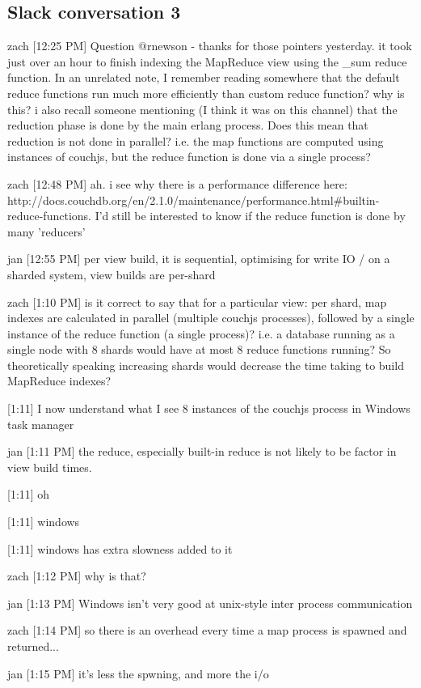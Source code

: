 \subsection{Slack conversation 3}
\label{appendix:slack3}

zach [12:25 PM]
Question @rnewson - thanks for those pointers yesterday. it took just over an hour to finish indexing the MapReduce view using the \_sum reduce function. In an unrelated note, I remember reading somewhere that the default reduce functions run much more efficiently than custom reduce function? why is this? i also recall someone mentioning (I think it was on this channel) that the reduction phase is done by the main erlang process. Does this mean that reduction is not done in parallel? i.e. the map functions are computed using instances of couchjs, but the reduce function is done via a single process?


zach [12:48 PM]
ah. i see why there is a performance difference here: http://docs.couchdb.org/en/2.1.0/maintenance/performance.html\#builtin-reduce-functions. I'd still be interested to know if the reduce function is done by many 'reducers'


jan [12:55 PM]
per view build, it is sequential, optimising for write IO / on a sharded system, view builds are per-shard


zach [1:10 PM]
is it correct to say that for a particular view: per shard, map indexes are calculated in parallel (multiple couchjs processes), followed by a single instance of the reduce function (a single process)? i.e. a database running as a single node with 8 shards would have at most 8 reduce functions running? So theoretically speaking increasing shards would decrease the time taking to build MapReduce indexes?


[1:11]
I now understand what I see 8 instances of the couchjs process in Windows task manager


jan [1:11 PM]
the reduce, especially built-in reduce is not likely to be factor in view build times.


[1:11]
oh


    [1:11]
windows


    [1:11]
windows has extra slowness added to it


zach [1:12 PM]
why is that?


jan [1:13 PM]
Windows isn’t very good at unix-style inter process communication


zach [1:14 PM]
so there is an overhead every time a map process is spawned and returned...


jan [1:15 PM]
it’s less the spwning, and more the i/o